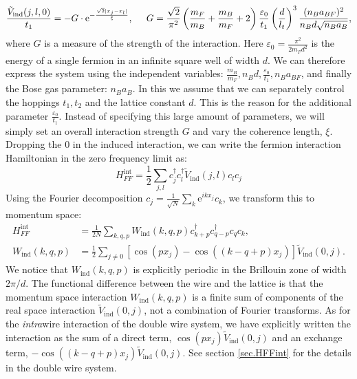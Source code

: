 \begin{equation}
\frac{\tilde{V}_{\text{ind}}(j, l, 0)}{t_1} = -G \cdot \text{e}^{-\frac{\sqrt{2}|x_j - x_l|}{\xi}}, \hspace{0.5cm} G = \frac{\sqrt{2}}{\pi^2} \left(\frac{m_F}{m_B} + \frac{m_B}{m_F} + 2\right)\frac{\varepsilon_0}{t_1}\left(\frac{d}{l_t}\right)^3 \frac{(n_Ba_{BF})^2}{n_Bd\sqrt{n_Ba_B}},
\label{eq.Inducedcinteractionrealspaceunitless.kitaevchain} 
\end{equation}
where $G$ is a measure of the strength of the interaction. Here $\varepsilon_0 = \frac{\pi^2}{2m_Fd^2}$ is the energy of a single fermion in an infinite square well of width $d$. We can therefore express the system using the independent variables: $\frac{m_B}{m_F}, n_Bd, \frac{\varepsilon_0}{t_1}, n_B a_{BF}$, and finally the Bose gas parameter: $n_B a_{B}$. In this we assume that we can separately control the hoppings $t_1, t_2$ and the lattice constant $d$. This is the reason for the additional parameter $\frac{\varepsilon_0}{t_1}$. Instead of specifying this large amount of parameters, we will simply set an overall interaction strength $G$ and vary the coherence length, $\xi$. Dropping the $0$ in the induced interaction, we can write the fermion interaction Hamiltonian in the zero frequency limit as:
\begin{equation}
H^{\text{int}}_{FF} = \frac{1}{2}\sum_{j,l} c^\dagger_j c^\dagger_l \tilde{V}_{\text{ind}}(j, l) c_l c_j
\label{eq.Hintrealspace.lattice}
\end{equation}
Using the Fourier decomposition $c_j = \frac{1}{\sqrt{N}}\sum_k \text{e}^{ikx_j}c_k$, we transform this to momentum space:
\begin{align}
H^{\text{int}}_{FF} &= \frac{1}{2N} \sum_{k, q, p} W_{\text{ind}}(k, q, p) c^\dagger_{k + p} c^\dagger_{q - p} c_q c_k, \nonumber \\  
W_{\text{ind}}(k, q, p) &= \frac{1}{2}\sum_{j\neq 0} \left[\cos(px_j) - \cos((k - q + p)x_j) \right]\tilde{V}_{\text{ind}}(0, j). 
\label{eq.Hintmomentumspace.lattice}
\end{align}
We notice that $W_{\text{ind}}(k, q, p)$ is explicitly periodic in the Brillouin zone of width $2\pi / d$. The functional difference between the wire and the lattice is that the momentum space interaction $W_{\text{ind}}(k, q, p)$ is a finite sum of components of the real space interaction $\tilde{V}_{\text{ind}}(0, j)$, not a combination of Fourier transforms. As for the \textit{intra}wire interaction of the double wire system, we have explicitly written the interaction as the sum of a direct term, $\cos(px_j)\tilde{V}_{\text{ind}}(0, j)$ and an exchange term, $ - \cos((k - q + p)x_j)\tilde{V}_{\text{ind}}(0, j)$. See section \ref{sec.HFFint} for the details in the double wire system.

